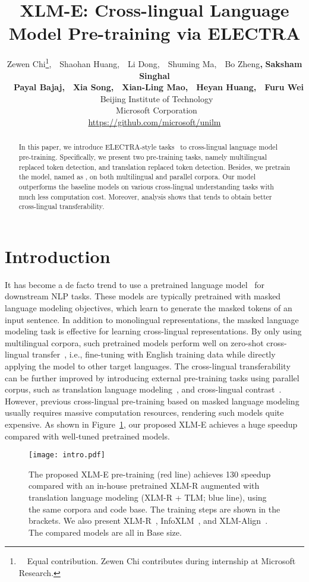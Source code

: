 \documentclass[11pt]{article}
\title{XLM-E: Cross-lingual Language Model Pre-training via ELECTRA}
\author{Zewen Chi\thanks{\ \ Equal contribution. Zewen Chi contributes during internship at Microsoft Research.},~~Shaohan Huang,~~Li Dong,~~Shuming Ma,~~Bo Zheng\textbf{,}
\textbf{Saksham Singhal}\\~~\textbf{Payal Bajaj}\textbf{,}~~\textbf{Xia Song}\textbf{,}~~\textbf{Xian-Ling Mao}\textbf{,}~~\textbf{Heyan Huang}\textbf{,}~~\textbf{Furu Wei}\\
~Beijing Institute of Technology \\
~Microsoft Corporation \\
\url{https://github.com/microsoft/unilm} \\}
\date{}
\newcommand\our{\makebox{\textsc{XLM-E}}}
\begin{document}
\maketitle
\begin{abstract}
In this paper, we introduce ELECTRA-style tasks~\cite{electra} to cross-lingual language model pre-training. Specifically, we present two pre-training tasks, namely multilingual replaced token detection, and translation replaced token detection. Besides, we pretrain the model, named as \our{}, on both multilingual and parallel corpora. Our model outperforms the baseline models on various cross-lingual understanding tasks with much less computation cost. Moreover, analysis shows that \our{} tends to obtain better cross-lingual transferability.
\end{abstract}


\section{Introduction}
\label{sec:intro}

It has become a de facto trend to use a pretrained language model~\cite{bert,unilm,xlnet,unilmv2} for downstream NLP tasks.
These models are typically pretrained with masked language modeling objectives, which learn to generate the masked tokens of an input sentence.
In addition to monolingual representations, the masked language modeling task is effective for learning cross-lingual representations.
By only using multilingual corpora, such pretrained models perform well on zero-shot cross-lingual transfer~\cite{bert,xlmr}, i.e., fine-tuning with English training data while directly applying the model to other target languages.
The cross-lingual transferability can be further improved by introducing external pre-training tasks using parallel corpus, such as translation language modeling~\cite{xlm}, and cross-lingual contrast~\cite{infoxlm}.
However, previous cross-lingual pre-training based on masked language modeling usually requires massive computation resources, rendering such models quite expensive.
As shown in Figure~\ref{fig:speedup}, our proposed XLM-E achieves a huge speedup compared with well-tuned pretrained models.


\begin{figure}[t]
\centering
\texttt{[image: intro.pdf]}
\caption{The proposed XLM-E pre-training (red line) achieves 130 speedup compared with an in-house pretrained XLM-R augmented with translation language modeling (XLM-R + TLM; blue line), using the same corpora and code base. The training steps are shown in the brackets. We also present XLM-R~\cite{xlmr}, InfoXLM~\cite{infoxlm}, and XLM-Align~\cite{xlmalign}. The compared models are all in Base size.}
\label{fig:speedup}
\end{figure}
\end{document}
